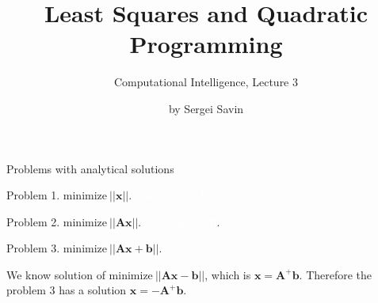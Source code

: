 \documentclass{beamer}
\title{Least Squares and Quadratic Programming}
\subtitle{Computational Intelligence, Lecture 3}
\author{by Sergei Savin}
\date{\mydate}
\begin{document}
\maketitle


%
%



\begin{frame}{Problems with analytical solutions}
\begin{flushleft}

Problem 1. $\text{minimize} \ ||\mathbf{x}||$. \textcolor{white}{Solution $\mathbf{x} = \mathbf{0}$} 

\bigskip

Problem 2. $\text{minimize} \ ||\mathbf{A}\mathbf{x}||$. \textcolor{white}{Solution $\mathbf{x} = \mathbf{0}$}.

\bigskip

Problem 3. $\text{minimize} \ ||\mathbf{A}\mathbf{x} + \mathbf{b}||$. 

\bigskip

We know solution of $\text{minimize} \ ||\mathbf{A}\mathbf{x} - \mathbf{b}||$, which is $\mathbf{x} = \mathbf{A}^+ \mathbf{b}$. Therefore the problem 3 has a solution $\mathbf{x} = -\mathbf{A}^+ \mathbf{b}$.
 
\end{flushleft}
\end{frame}
\end{document}
